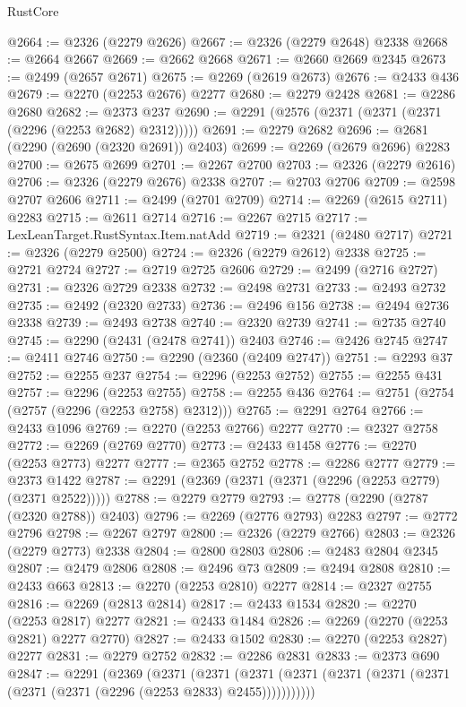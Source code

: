 \begin{lexlean}{RustCore}
\begin{coremodule}
@2664 := @2326 (@2279 @2626)
@2667 := @2326 (@2279 @2648) @2338
@2668 := @2664 @2667
@2669 := @2662 @2668
@2671 := @2660 @2669 @2345
@2673 := @2499 (@2657 @2671)
@2675 := @2269 (@2619 @2673)
@2676 := @2433 @436
@2679 := @2270 (@2253 @2676) @2277
@2680 := @2279 @2428
@2681 := @2286 @2680
@2682 := @2373 @237
@2690 := @2291 (@2576 (@2371 (@2371 (@2371 (@2296 (@2253 @2682) @2312)))))
@2691 := @2279 @2682
@2696 := @2681 (@2290 (@2690 (@2320 @2691)) @2403)
@2699 := @2269 (@2679 @2696) @2283
@2700 := @2675 @2699
@2701 := @2267 @2700
@2703 := @2326 (@2279 @2616)
@2706 := @2326 (@2279 @2676) @2338
@2707 := @2703 @2706
@2709 := @2598 @2707 @2606
@2711 := @2499 (@2701 @2709)
@2714 := @2269 (@2615 @2711) @2283
@2715 := @2611 @2714
@2716 := @2267 @2715
@2717 := LexLeanTarget.RustSyntax.Item.natAdd
@2719 := @2321 (@2480 @2717)
@2721 := @2326 (@2279 @2500)
@2724 := @2326 (@2279 @2612) @2338
@2725 := @2721 @2724
@2727 := @2719 @2725 @2606
@2729 := @2499 (@2716 @2727)
@2731 := @2326 @2729 @2338
@2732 := @2498 @2731
@2733 := @2493 @2732
@2735 := @2492 (@2320 @2733)
@2736 := @2496 @156
@2738 := @2494 @2736 @2338
@2739 := @2493 @2738
@2740 := @2320 @2739
@2741 := @2735 @2740
@2745 := @2290 (@2431 (@2478 @2741)) @2403
@2746 := @2426 @2745
@2747 := @2411 @2746
@2750 := @2290 (@2360 (@2409 @2747))
@2751 := @2293 @37
@2752 := @2255 @237
@2754 := @2296 (@2253 @2752)
@2755 := @2255 @431
@2757 := @2296 (@2253 @2755)
@2758 := @2255 @436
@2764 := @2751 (@2754 (@2757 (@2296 (@2253 @2758) @2312)))
@2765 := @2291 @2764
@2766 := @2433 @1096
@2769 := @2270 (@2253 @2766) @2277
@2770 := @2327 @2758
@2772 := @2269 (@2769 @2770)
@2773 := @2433 @1458
@2776 := @2270 (@2253 @2773) @2277
@2777 := @2365 @2752
@2778 := @2286 @2777
@2779 := @2373 @1422
@2787 := @2291 (@2369 (@2371 (@2371 (@2296 (@2253 @2779) (@2371 @2522)))))
@2788 := @2279 @2779
@2793 := @2778 (@2290 (@2787 (@2320 @2788)) @2403)
@2796 := @2269 (@2776 @2793) @2283
@2797 := @2772 @2796
@2798 := @2267 @2797
@2800 := @2326 (@2279 @2766)
@2803 := @2326 (@2279 @2773) @2338
@2804 := @2800 @2803
@2806 := @2483 @2804 @2345
@2807 := @2479 @2806
@2808 := @2496 @73
@2809 := @2494 @2808
@2810 := @2433 @663
@2813 := @2270 (@2253 @2810) @2277
@2814 := @2327 @2755
@2816 := @2269 (@2813 @2814)
@2817 := @2433 @1534
@2820 := @2270 (@2253 @2817) @2277
@2821 := @2433 @1484
@2826 := @2269 (@2270 (@2253 @2821) @2277 @2770)
@2827 := @2433 @1502
@2830 := @2270 (@2253 @2827) @2277
@2831 := @2279 @2752
@2832 := @2286 @2831
@2833 := @2373 @690
@2847 := @2291
    (@2369
      (@2371
        (@2371
          (@2371 (@2371 (@2371 (@2371 (@2371 (@2371 (@2371 (@2296 (@2253 @2833) @2455)))))))))))

\end{coremodule}
\end{lexlean}
